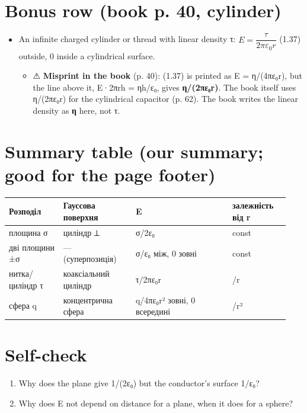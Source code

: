 \documentclass[11pt,a4paper,oneside]{book}
\newcommand{\warn}{{\sffamily\color{warncol}⚠}}
\begin{document}
\section*{Bonus row (book p. 40, cylinder)}
\begin{itemize}
\item An infinite charged cylinder or thread with linear density τ: $E = \dfrac{\tau}{2\pi\varepsilon_0 r}$ (1.37) outside, 0 inside a cylindrical surface.
\begin{itemize}
\item \warn{} \textbf{Misprint in the book} (p. 40): (1.37) is printed as E = η/(4πε₀r), but the line above it, E·2πrh = ηh/ε₀, gives \textbf{η/(2πε₀r)}. The book itself uses η/(2πε₀r) for the cylindrical capacitor (p. 62). The book writes the linear density as \textbf{η} here, not τ.
\end{itemize}
\end{itemize}

\section*{Summary table (our summary; good for the page footer)}
{\small
\begin{longtable}{>{\raggedright\arraybackslash}p{0.180\linewidth}>{\raggedright\arraybackslash}p{0.240\linewidth}>{\raggedright\arraybackslash}p{0.324\linewidth}>{\raggedright\arraybackslash}p{0.192\linewidth}}
\toprule
\textbf{Розподіл} & \textbf{Гауссова поверхня} & \textbf{E} & \textbf{залежність від r} \\
\midrule
\endhead
площина σ & циліндр ⟂ & σ/2ε₀ & const \\
дві площини ±σ & — (суперпозиція) & σ/ε₀ між, 0 зовні & const \\
нитка/циліндр τ & коаксіальний циліндр & τ/2πε₀r & 1/r \\
сфера q & концентрична сфера & q/4πε₀r² зовні, 0 всередині & 1/r² \\
\bottomrule
\end{longtable}
}

\section*{Self-check}
\begin{enumerate}
\item Why does the plane give 1/(2ε₀) but the conductor's surface 1/ε₀?
\item Why does E not depend on distance for a plane, when it does for a sphere?
\end{enumerate}
\end{document}
